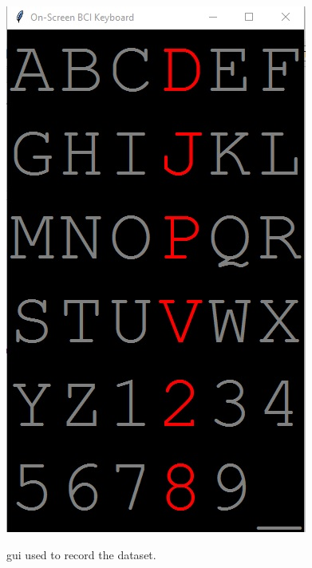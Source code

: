 \begin{figure}[!ht]
{            \includegraphics[width=\subFigureWidth]{images/approach/recorded_gui_intensification.jpg}
        }
    \caption{\ac{gui} used to record the dataset.}
    \label{fig:recorded-gui}
\end{figure}
\clearpage
